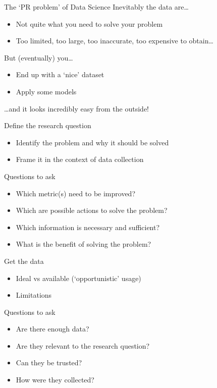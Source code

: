 \begin{frame}{The `PR problem' of Data Science}
    Inevitably the data are\ldots\vspace{-1ex}
    \begin{itemize}
        \item Not quite what you need to solve your problem
        \item Too limited, too large, too inaccurate, too expensive to
              obtain\ldots
    \end{itemize}
    \vfill
    But (eventually) you\ldots\vspace{-1ex}
    \begin{itemize}
        \item End up with a `nice' dataset
        \item Apply some models
    \end{itemize}
    \vspace{-1ex}
    \ldots and it \alert{looks} incredibly easy from the outside!
\end{frame}

\begin{frame}[t]{Define the research question}
    \begin{itemize}
        \item Identify the problem and \alert{why} it should be solved
        \item Frame it in the context of data collection
    \end{itemize}
    \vfill
    \begin{block}{Questions to ask}
        \begin{itemize}
            \item Which metric(s) need to be improved?
            \item Which are possible actions to solve the problem?
            \item Which information is necessary and sufficient?
            \item What is the benefit of solving the problem?
        \end{itemize}
    \end{block}
\end{frame}

\begin{frame}[t]{Get the data}
    \begin{itemize}
        \item \alert{Ideal vs available} (`opportunistic' usage)
        \item Limitations
    \end{itemize}
    \vfill
    \begin{block}{Questions to ask}
        \begin{itemize}
            \item Are there enough data?
            \item Are they relevant to the research question?
            \item Can they be trusted?
            \item How were they collected?
        \end{itemize}
    \end{block}
\end{frame}

